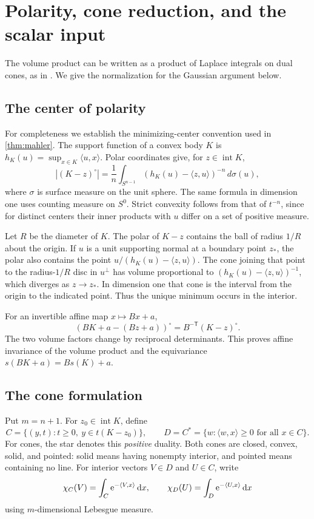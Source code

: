 \section{Polarity, cone reduction, and the scalar input}\label{sec:01-cones}

The volume product can be written as a product of Laplace integrals on dual cones, as in \textcite[Lemma~2.1 and Corollary~4.1]{Klartag2018}. We give the normalization for the Gaussian argument below.

\subsection{The center of polarity}
For completeness we establish the minimizing-center convention used in \cref{thm:mahler}. The support function of a convex body $K$ is $h_K(u)=\sup_{x\in K}\langle u,x\rangle$. Polar coordinates give, for $z\in\operatorname{int}K$,
\[
 |(K-z)^\circ|=\frac1n\int_{S^{n-1}}
      (h_K(u)-\langle z,u\rangle)^{-n}\,d\sigma(u),
\]
where $\sigma$ is surface measure on the unit sphere. The same formula in dimension one uses counting measure on $S^0$. Strict convexity follows from that of $t^{-n}$, since for distinct centers their inner products with $u$ differ on a set of positive measure.

Let $R$ be the diameter of $K$. The polar of $K-z$ contains the ball of radius $1/R$ about the origin. If $u$ is a unit supporting normal at a boundary point $z_*$, the polar also contains the point $u/(h_K(u)-\langle z,u\rangle)$. The cone joining that point to the radius-$1/R$ disc in $u^\perp$ has volume proportional to $(h_K(u)-\langle z,u\rangle)^{-1}$, which diverges as $z\to z_*$. In dimension one that cone is the interval from the origin to the indicated point. Thus the unique minimum occurs in the interior.

For an invertible affine map $x\mapsto Bx+a$,
\[
 (BK+a-(Bz+a))^\circ=B^{-\mathsf T}(K-z)^\circ.
\]
The two volume factors change by reciprocal determinants. This proves affine invariance of the volume product and the equivariance $s(BK+a)=Bs(K)+a$.

\subsection{The cone formulation}
Put $m=n+1$. For $z_0\in\operatorname{int}K$, define
\[
C=\{(y,t):t\ge0,\ y\in t(K-z_0)\},\qquad
D=C^*=\{w:\langle w,x\rangle\ge0\text{ for all }x\in C\}.
\]
For cones, the star denotes this \emph{positive} duality. Both cones are closed, convex, solid, and pointed: solid means having nonempty interior, and pointed means containing no line. For interior vectors $V\in D$ and $U\in C$, write
\[
 \chi_C(V)=\int_C \mathrm{e}^{-\langle V,x\rangle}\,\mathrm{d} x,\qquad
 \chi_D(U)=\int_D \mathrm{e}^{-\langle U,x\rangle}\,\mathrm{d} x
\]
using $m$-dimensional Lebesgue measure.


